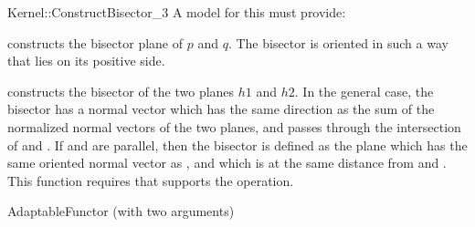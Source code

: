 \begin{ccRefFunctionObjectConcept}{Kernel::ConstructBisector_3}
A model for this must provide:


{constructs the bisector plane of $p$ and $q$.
The bisector is oriented in such a way that  lies on its
positive side. }

{constructs the bisector of the two planes $h1$ and $h2$.
In the general case, the bisector has a normal vector which has the same
direction as the sum of the normalized normal vectors of the two planes, and
passes through the intersection of  and .
If  and  are parallel, then the bisector is defined as the
plane which has the same oriented normal vector as , and which is at
the same distance from  and .
This function requires that  supports the 
operation.}

\ccRefines
AdaptableFunctor (with two arguments)

\ccSeeAlso
{}

\end{ccRefFunctionObjectConcept}
